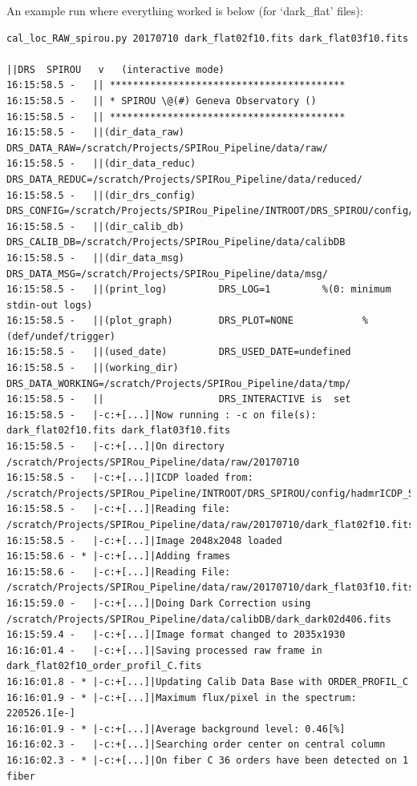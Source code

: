 An example run where everything worked is below (for `dark\_flat' files):

\begin{lstlisting}[style=text]
cal_loc_RAW_spirou.py 20170710 dark_flat02f10.fits dark_flat03f10.fits

||DRS  SPIROU   v   (interactive mode)
16:15:58.5 -   || *****************************************
16:15:58.5 -   || * SPIROU \@(#) Geneva Observatory ()
16:15:58.5 -   || *****************************************
16:15:58.5 -   ||(dir_data_raw)      DRS_DATA_RAW=/scratch/Projects/SPIRou_Pipeline/data/raw/
16:15:58.5 -   ||(dir_data_reduc)    DRS_DATA_REDUC=/scratch/Projects/SPIRou_Pipeline/data/reduced/
16:15:58.5 -   ||(dir_drs_config)    DRS_CONFIG=/scratch/Projects/SPIRou_Pipeline/INTROOT/DRS_SPIROU/config/
16:15:58.5 -   ||(dir_calib_db)      DRS_CALIB_DB=/scratch/Projects/SPIRou_Pipeline/data/calibDB
16:15:58.5 -   ||(dir_data_msg)      DRS_DATA_MSG=/scratch/Projects/SPIRou_Pipeline/data/msg/
16:15:58.5 -   ||(print_log)         DRS_LOG=1         %(0: minimum stdin-out logs)
16:15:58.5 -   ||(plot_graph)        DRS_PLOT=NONE            %(def/undef/trigger)
16:15:58.5 -   ||(used_date)         DRS_USED_DATE=undefined
16:15:58.5 -   ||(working_dir)       DRS_DATA_WORKING=/scratch/Projects/SPIRou_Pipeline/data/tmp/
16:15:58.5 -   ||                    DRS_INTERACTIVE is  set
16:15:58.5 -   |-c:+[...]|Now running : -c on file(s):  dark_flat02f10.fits dark_flat03f10.fits
16:15:58.5 -   |-c:+[...]|On directory /scratch/Projects/SPIRou_Pipeline/data/raw/20170710
16:15:58.5 -   |-c:+[...]|ICDP loaded from: /scratch/Projects/SPIRou_Pipeline/INTROOT/DRS_SPIROU/config/hadmrICDP_SPIROU.py
16:15:58.5 -   |-c:+[...]|Reading file: /scratch/Projects/SPIRou_Pipeline/data/raw/20170710/dark_flat02f10.fits
16:15:58.5 -   |-c:+[...]|Image 2048x2048 loaded
16:15:58.6 - * |-c:+[...]|Adding frames
16:15:58.6 -   |-c:+[...]|Reading File: /scratch/Projects/SPIRou_Pipeline/data/raw/20170710/dark_flat03f10.fits
16:15:59.0 -   |-c:+[...]|Doing Dark Correction using /scratch/Projects/SPIRou_Pipeline/data/calibDB/dark_dark02d406.fits
16:15:59.4 -   |-c:+[...]|Image format changed to 2035x1930
16:16:01.4 -   |-c:+[...]|Saving processed raw frame in dark_flat02f10_order_profil_C.fits
16:16:01.8 - * |-c:+[...]|Updating Calib Data Base with ORDER_PROFIL_C
16:16:01.9 - * |-c:+[...]|Maximum flux/pixel in the spectrum: 220526.1[e-]
16:16:01.9 - * |-c:+[...]|Average background level: 0.46[%]
16:16:02.3 -   |-c:+[...]|Searching order center on central column
16:16:02.3 - * |-c:+[...]|On fiber C 36 orders have been detected on 1 fiber

\end{lstlisting}
